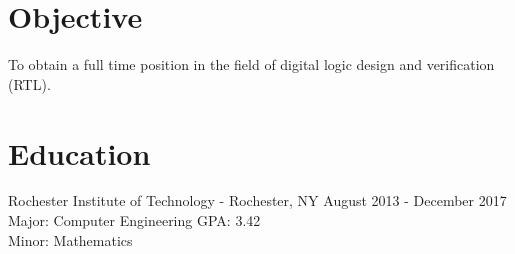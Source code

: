 \documentclass[a4paper,margin,line]{resume}
\newcommand{\rdate}[1]{\hfill {\small #1}}
\begin{document}
\begin{resume}
\section{\mysidestyle Objective}
    To obtain a full time position in the field of digital logic design and verification (RTL).


\section{\mysidestyle Education}
    \begin{compactdesc}
        \item[Rochester Institute of Technology] - Rochester, NY \rdate{August 2013 - December 2017} \\
            Major: Computer Engineering  \rdate{GPA: 3.42}\\
            Minor: Mathematics \\
    \end{compactdesc}


\end{resume}
\end{document}

